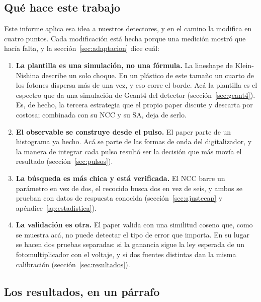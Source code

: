 \documentclass[11pt,a4paper]{article}
\begin{document}
\subsection{Qué hace este trabajo}

Este informe aplica esa idea a nuestros detectores, y en el camino la
modifica en cuatro puntos. Cada modificación está hecha porque una medición
mostró que hacía falta, y la sección~\ref{sec:adaptacion} dice cuál:

\begin{enumerate}
\item \textbf{La plantilla es una simulación, no una fórmula.} La lineshape
      de Klein-Nishina describe un solo choque. En un plástico de este tamaño
      un cuarto de los fotones dispersa más de una vez, y eso corre el borde.
      Acá la plantilla es el espectro que da una simulación de Geant4 del
      detector (sección~\ref{sec:geant4}). Es, de hecho, la tercera estrategia
      que el propio paper discute y descarta por costosa; combinada con su
      NCC y su SA, deja de serlo.
\item \textbf{El observable se construye desde el pulso.} El paper parte de
      un histograma ya hecho. Acá se parte de las formas de onda del
      digitalizador, y la manera de integrar cada pulso resultó ser la
      decisión que más movía el resultado (sección~\ref{sec:pulsos}).
\item \textbf{La búsqueda es más chica y está verificada.} El NCC barre un
      parámetro en vez de dos, el recocido busca dos en vez de seis, y ambos
      se prueban con datos de respuesta conocida
      (sección~\ref{sec:ajustecap} y apéndice~\ref{ap:estadistica}).
\item \textbf{La validación es otra.} El paper valida con una similitud
      coseno que, como se muestra acá, no puede detectar el tipo de error que
      importa. En su lugar se hacen dos pruebas separadas: si la ganancia
      sigue la ley esperada de un fotomultiplicador con el voltaje, y si dos
      fuentes distintas dan la misma calibración
      (sección~\ref{sec:resultados}).
\end{enumerate}

\subsection{Los resultados, en un párrafo}
\end{document}
